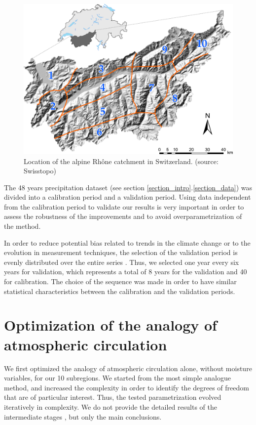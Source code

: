 \documentclass[5p]{elsarticle}
\begin{document}
\begin{figure}[htb]
	\centerline{\includegraphics[width=\linewidth]{figures/figure_map.pdf}}
	\caption{Location of the alpine Rh\^{o}ne catchment in Switzerland. (source: Swisstopo)}
	\label{fig:map}
\end{figure}

The 48 years precipitation dataset (see section \ref{section_intro}.\ref{section_data}) was divided into a calibration period and a validation period. Using data independent from the calibration period to validate our results is very important in order to assess the robustness of the improvements and to avoid overparametrization of the method.

In order to reduce potential bias related to trends in the climate change or to the evolution in measurement techniques, the selection of the validation period is evenly distributed over the entire series \citep{BenDaoud2010}. Thus, we selected one year every six years for validation, which represents a total of 8 years for the validation and 40 for calibration. The choice of the sequence was made in order to have similar statistical characteristics between the calibration and the validation periods.


\section{Optimization of the analogy of atmospheric circulation}

We first optimized the analogy of atmospheric circulation alone, without moisture variables, for our 10 subregions. We started from the most simple analogue method, and increased the complexity in order to identify the degrees of freedom that are of particular interest. Thus, the tested parametrization evolved iteratively in complexity. We do not provide the detailed results of the intermediate stages \citep[see][for the details]{Horton2012a}, but only the main conclusions.
\end{document}
